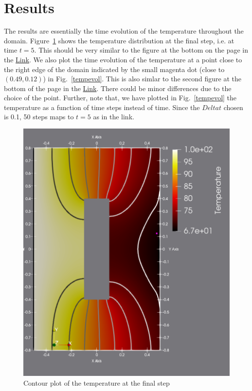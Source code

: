 \documentclass[preprint,12pt]{elsarticle}
\numberwithin{equation}{section}
\begin{document}
\section{Results}
The results are essentially the time evolution of the temperature throughout the domain. Figure~\ref{finalstep} shows the temperature distribution at the final step, i.e. at time $t=5$. This should be very similar to the figure at the bottom on the page in the \href{https://www.mathworks.com/help/pde/ug/heat-transfer-problem-with-temperature-dependent-properties.html}{Link}. We also plot the time evolution of the temperature at a point close to the right edge of the domain indicated by the small magenta dot (close to $(0.49, 0.12)$) in Fig.~\ref{tempevol}. This is also simlar to the second figure at the bottom of the page in the \href{https://www.mathworks.com/help/pde/ug/heat-transfer-problem-with-temperature-dependent-properties.html}{Link}. There could be minor differences due to the choice of the point. Further, note that, we have plotted in Fig.~\ref{tempevol} the temperature as a function of time steps instead of time. Since the $Delta t$ chosen is 0.1, 50 steps maps to $t=5$ as in the link.
\begin{figure}[H]
	\begin{center}	
	\includegraphics[scale=0.3]{./Images/contour.pdf}
	\caption{Contour plot of the temperature at the final step \label{finalstep}}
	\end{center}
\end{figure}
\end{document}
